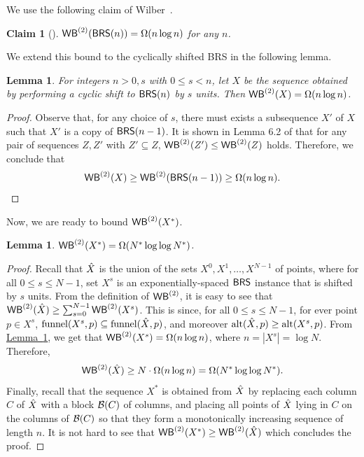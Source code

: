 \documentclass[11pt]{article}
\numberwithin{equation}{section}
\newtheorem{lemma}[theorem]{Lemma}
\newtheorem{claim}[theorem]{Claim}
\theoremstyle{definition}
\theoremstyle{plain}
\newcommand{\expref}[2]{\hyperref[#2]{#1~\ref{#2}}}
\begin{document}
We use the following claim of Wilber~\cite{wilber}. %
%
\begin{claim}
[\cite{wilber}]$\mathsf{WB}^{(2)}(\mathsf{BRS}(n))=\Omega(n\log n)$ for any $n$.
\end{claim}

We extend this bound to the cyclically shifted BRS in the following lemma.
\begin{lemma}
\label{lem:shifted BRS} For integers $n>0,s$ with  $0\leq s<n$, let $X$ be the sequence obtained by performing
a cyclic shift to $\mathsf{BRS}(n)$ by $s$ units. Then $\mathsf{WB}^{(2)}(X)=\Omega(n\log n)$. 
\end{lemma}

\begin{proof}
Observe that, for any choice of $s$, there must exists
a subsequence $X'$ of $X$ such that $X'$ is a copy of $\mathsf{BRS}(n-1)$. It is shown in Lemma 6.2 of \cite{LevyT19}
that for any pair of sequences $Z,Z'$ with $Z'\subseteq Z$, $\mathsf{WB}^{(2)}(Z')\le\mathsf{WB}^{(2)}(Z)$ holds. Therefore, we conclude that
\[
\mathsf{WB}^{(2)}(X)\ge\mathsf{WB}^{(2)}(\mathsf{BRS}(n-1))\ge \Omega(n\log n).
\]
\end{proof}





Now, we are ready to bound  $\mathsf{WB}^{(2)}(X^{*})$.

\begin{lemma}
$\mathsf{WB}^{(2)}(X^{*})=\Omega(N^{*}\log\log N^{*})$.
\end{lemma}

\begin{proof}
Recall that $\hat{X}$ is the union of the sets $X^{0},X^{1},\dots,X^{N-1}$ of points, where for all $0\leq s\leq N-1$, set $X^{s}$ is an exponentially-spaced $\mathsf{BRS}$ instance that is shifted
by $s$ units. From the definition
of $\mathsf{WB}^{(2)}$, it is easy to see that $\mathsf{WB}^{(2)}(\hat{X})\ge\sum_{s=0}^{N-1}\mathsf{WB}^{(2)}(X^{s})$. This is since, for all $0\leq s\leq N-1$, for ever point $p\in X^{s}$, $\mathrm{funnel}(X^s,p)\subseteq \mathrm{funnel}(\hat{X}, p)$, and moreover $\mathrm{alt}(\hat{X},p)\geq \mathrm{alt}(X^s,p)$.
From \expref{Lemma}{lem:shifted BRS}, we get that $\mathsf{WB}^{(2)}(X^{s})=\Omega(n\log n)$, where $n=|X^s|=\log N$. Therefore,
\[
\mathsf{WB}^{(2)}(\hat{X})\ge N\cdot\Omega(n\log n)=\Omega(N^{*}\log\log N^{*}).
\]
Finally, recall that the sequence $X^{*}$ is obtained from $\hat{X}$
by replacing each column $C$ of $\hat{X}$ with a block ${\mathcal{B}}(C)$ of columns, and placing all points of $\hat{X}$ lying in $C$ on the columns of ${\mathcal{B}}(C)$ so that they form a monotonically increasing sequence of length $n$. It is not hard to see that $\mathsf{WB}^{(2)}(X^{*})\ge\mathsf{WB}^{(2)}(\hat{X})$
which concludes the proof.
\end{proof}
\end{document}
